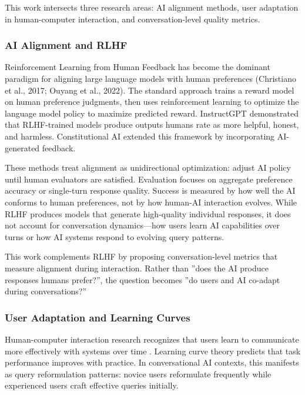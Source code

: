 
This work intersects three research areas: AI alignment methods, user adaptation in human-computer interaction, and conversation-level quality metrics.

\subsubsection{AI Alignment and RLHF}

Reinforcement Learning from Human Feedback has become the dominant paradigm for aligning large language models with human preferences (Christiano et al., 2017; Ouyang et al., 2022). The standard approach trains a reward model on human preference judgments, then uses reinforcement learning to optimize the language model policy to maximize predicted reward. InstructGPT \citep{ouyang2022training} demonstrated that RLHF-trained models produce outputs humans rate as more helpful, honest, and harmless. Constitutional AI \citep{bai2022constitutional} extended this framework by incorporating AI-generated feedback.

These methods treat alignment as unidirectional optimization: adjust AI policy until human evaluators are satisfied. Evaluation focuses on aggregate preference accuracy or single-turn response quality. Success is measured by how well the AI conforms to human preferences, not by how human-AI interaction evolves. While RLHF produces models that generate high-quality individual responses, it does not account for conversation dynamics---how users learn AI capabilities over turns or how AI systems respond to evolving query patterns.

This work complements RLHF by proposing conversation-level metrics that measure alignment during interaction. Rather than ''does the AI produce responses humans prefer?'', the question becomes ''do users and AI co-adapt during conversations?''

\subsubsection{User Adaptation and Learning Curves}

Human-computer interaction research recognizes that users learn to communicate more effectively with systems over time \citep{newell1981mechanisms}. Learning curve theory predicts that task performance improves with practice. In conversational AI contexts, this manifests as query reformulation patterns: novice users reformulate frequently while experienced users craft effective queries initially.

